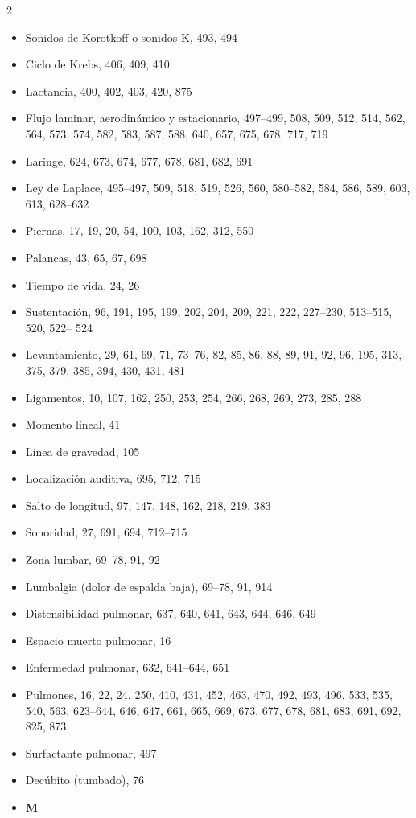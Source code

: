 \documentclass[12pt,a4paper]{book}
\begin{document}
\begin{multicols}{2}
\begin{itemize}[leftmargin=*]
  \item Sonidos de Korotkoff o sonidos K, 493, 494
  \item Ciclo de Krebs, 406, 409, 410
  \item Lactancia, 400, 402, 403, 420, 875
  \item Flujo laminar, aerodinámico y estacionario, 497--499, 508, 509, 512, 514, 562, 564, 573, 574, 582, 583, 587, 588, 640, 657, 675, 678, 717, 719
  \item Laringe, 624, 673, 674, 677, 678, 681, 682, 691
  \item Ley de Laplace, 495--497, 509, 518, 519, 526, 560, 580--582, 584, 586, 589, 603, 613, 628--632
  \item Piernas, 17, 19, 20, 54, 100, 103, 162, 312, 550
  \item Palancas, 43, 65, 67, 698
  \item Tiempo de vida, 24, 26
  \item Sustentación, 96, 191, 195, 199, 202, 204, 209, 221, 222, 227--230, 513--515, 520, 522-- 524
  \item Levantamiento, 29, 61, 69, 71, 73--76, 82, 85, 86, 88, 89, 91, 92, 96, 195, 313, 375, 379, 385, 394, 430, 431, 481
\item Ligamentos, 10, 107, 162, 250, 253, 254, 266, 268, 269, 273, 285, 288
  \item Momento lineal, 41
  \item Línea de gravedad, 105
  \item Localización auditiva, 695, 712, 715
  \item Salto de longitud, 97, 147, 148, 162, 218, 219, 383
  \item Sonoridad, 27, 691, 694, 712--715
  \item Zona lumbar, 69--78, 91, 92
  \item Lumbalgia (dolor de espalda baja), 69--78, 91, 914
  \item Distensibilidad pulmonar, 637, 640, 641, 643, 644, 646, 649
  \item Espacio muerto pulmonar, 16
  \item Enfermedad pulmonar, 632, 641--644, 651
  \item Pulmones, 16, 22, 24, 250, 410, 431, 452, 463, 470, 492, 493, 496, 533, 535, 540, 563, 623--644, 646, 647, 661, 665, 669, 673, 677, 678, 681, 683, 691, 692, 825, 873
  \item Surfactante pulmonar, 497
  \item Decúbito (tumbado), 76
  \item \textbf{M}

\end{itemize}
\end{multicols}
\end{document}
